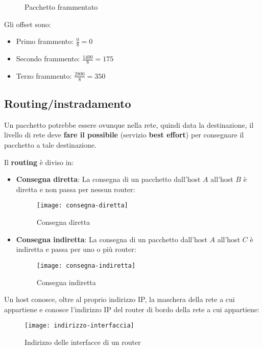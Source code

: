 \documentclass[a4paper]{article}
\begin{document}
\begin{example}
\begin{figure}[H]
    \vspace{2em}
    \noindent
    \caption{Pacchetto frammentato}
  \end{figure}

  \noindent
  Gli offset sono:
  \begin{itemize}
    \item Primo frammento: \( \frac{0}{8} = 0 \) 
    \item Secondo frammento: \( \frac{1400}{8} = 175 \) 
    \item Terzo frammento: \( \frac{2800}{8} = 350 \)
  \end{itemize}
\end{example}

\subsection{Routing/instradamento}
Un pacchetto potrebbe essere ovunque nella rete, quindi data la destinazione, il livello
di rete deve \textbf{fare il possibile} (servizio \textbf{best effort}) per consegnare il
pacchetto a tale destinazione.

Il \textbf{routing} è diviso in:
\begin{itemize}
  \item \textbf{Consegna diretta}: La consegna di un pacchetto dall'host \( A \) all'host
    \( B \) è diretta e non passa per nessun router:
    \begin{figure}[H]
      \centering
      \texttt{[image: consegna-diretta]}
      \caption{Consegna diretta}
    \end{figure}

  \item \textbf{Consegna indiretta}: La consegna di un pacchetto dall'host \( A \) all'host
    \( C \) è indiretta e passa per uno o più router:
    \begin{figure}[H]
      \centering
      \texttt{[image: consegna-indiretta]}
      \caption{Consegna indiretta}
    \end{figure}
\end{itemize}
Un host conosce, oltre al proprio indirizzo IP, la maschera della rete a cui appartiene
e conosce l'indirizzo IP del router di bordo della rete a cui appartiene:
\begin{figure}[H]
  \centering
  \texttt{[image: indirizzo-interfaccia]}
  \caption{Indirizzo delle interfacce di un router}
\end{figure}
\end{document}
